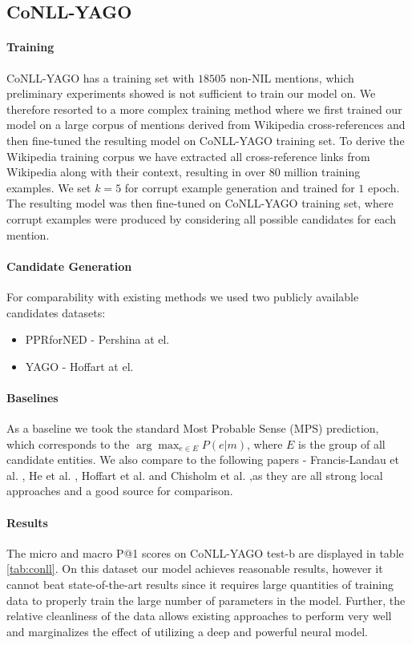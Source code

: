 \documentclass[11pt]{article}
\begin{document}
\subsection{CoNLL-YAGO}
\label{experiments-conll}

\paragraph{Training}
CoNLL-YAGO has a training set with $18505$ non-NIL mentions, which preliminary experiments showed is not sufficient to train our model on. We therefore resorted to a more complex training method where we first trained our model on a large corpus of mentions derived from Wikipedia cross-references and then fine-tuned the resulting model on CoNLL-YAGO training set. To derive the Wikipedia training corpus we have extracted all cross-reference links from Wikipedia along with their context, resulting in over $80$ million training examples. We set $k=5$ for corrupt example generation and trained for $1$ epoch. The resulting model was then fine-tuned on CoNLL-YAGO training set, where corrupt examples were produced by considering all possible candidates for each mention.

\paragraph{Candidate Generation}
For comparability with existing methods we used two publicly available candidates datasets:
\begin{itemize}
	\item PPRforNED - Pershina at el. 
	\item YAGO - Hoffart at el. 
\end{itemize}

\paragraph{Baselines}
As a baseline we took the standard Most Probable Sense (MPS) prediction, which corresponds to the $\arg\max_{e\in{{E}}}{P(e|m)}$, where $E$ is the group of all candidate entities.
We also compare to the following papers - Francis-Landau et al. , He et al. , Hoffart et al.  and Chisholm et al.  ,as they are all strong local approaches and a good source for comparison.

\paragraph{Results}
The micro and macro P@1 scores on CoNLL-YAGO test-b are displayed in table \ref{tab:conll}. On this dataset our model achieves reasonable results, however it cannot beat state-of-the-art results since it requires large quantities of training data to properly train the large number of parameters in the model.  Further, the relative cleanliness of the data allows existing approaches to perform very well and marginalizes the effect of utilizing a deep and powerful neural model.
\end{document}
